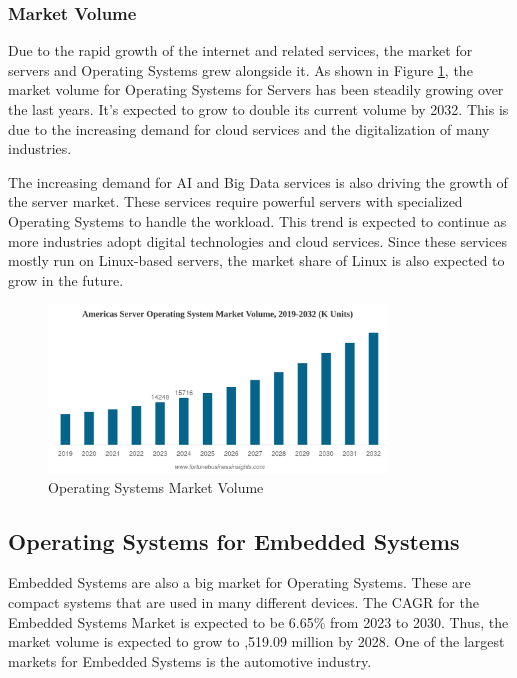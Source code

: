 \subsubsection{Market Volume}

Due to the rapid growth of the internet and related services, the market for servers and Operating Systems grew alongside it. 
As shown in Figure \ref{fig:Operating_System_Market_Volume}, the market volume for Operating Systems for Servers has been steadily growing over the last years.
It's expected to grow to double its current volume by 2032. This is due to the increasing demand for cloud services and the digitalization of many industries.

The increasing demand for AI and Big Data services is also driving the growth of the server market. These services require powerful servers with specialized Operating Systems to handle the workload.
This trend is expected to continue as more industries adopt digital technologies and cloud services. Since these services mostly run on Linux-based servers, the market share of Linux is also expected to grow in the future.

\begin{figure}[H]
    \centering
    \includegraphics[width=0.8\textwidth]{figures/Server-Market-Volume.png}
    \caption{Operating Systems Market Volume}
    \label{fig:Operating_System_Market_Volume}
\end{figure}

\cite{ServerOsMarketShare2}


\subsection{Operating Systems for Embedded Systems}

Embedded Systems are also a big market for Operating Systems. These are compact systems that are used in many different devices.
The CAGR for the Embedded Systems Market is expected to be 6.65\% from 2023 to 2030. Thus, the market volume is expected to grow to ,519.09 million by 2028.
One of the largest markets for Embedded Systems is the automotive industry. 

